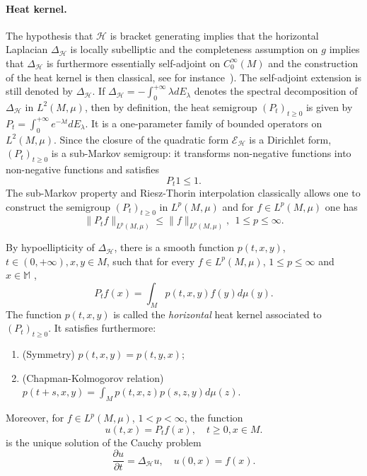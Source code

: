 \documentclass[11pt]{article}
\numberwithin{equation}{section}
\newcommand{\Ho}{\mathcal H}
\begin{document}
	\paragraph{Heat kernel.}The hypothesis that $\mathcal{H}$ is bracket generating implies that the horizontal Laplacian $\Delta_{\mathcal{H}}$ is locally subelliptic and the completeness assumption on $g$ implies that $\Delta_{\mathcal{H}}$ is furthermore essentially self-adjoint on $C_0^\infty(M)$ and the construction of the heat kernel is then classical, see for instance~\cite{BaudoinEMS2014}). The self-adjoint extension is still denoted by $\Delta_{\mathcal{H}}$. If $\Delta_\mathcal{H}=-\int_0^{+\infty} \lambda dE_\lambda$ denotes the spectral
decomposition of $\Delta_\mathcal{H}$ in $L^2 (M,\mu)$, then by definition, the
heat semigroup $(P_t)_{t \ge 0}$ is given by $P_t= \int_0^{+\infty}
e^{-\lambda t} dE_\lambda$. It is a one-parameter family of bounded operators on
$L^2 (M,\mu)$. Since the closure of the quadratic form $\mathcal{E}_\mathcal{H}$ is a Dirichlet form, $(P_t)_{t \ge 0}$ is a sub-Markov semigroup: it transforms non-negative functions into non-negative functions and satisfies
\begin{equation*}
P_t 1 \le 1.
\end{equation*}
The sub-Markov property and  Riesz-Thorin interpolation classically allows one to construct the semigroup $(P_t)_{t \ge 0}$ in $L^p(M,\mu)$ and for $f \in L^p(M,\mu)$ one has
\begin{equation*}
\|P_tf\|_{L^p(M , \mu)} \le \|f\|_{L^p(M, \mu)},\ \  1\le p\le \infty.
\end{equation*}

By hypoellipticity of $\Delta_\Ho$, there is a smooth function $p(t,x,y)$, $t \in (0,+\infty), x,y \in M$, such that for every $f \in L^p(M,\mu)$, $1 \le p \le \infty$ and $x \in \mathbb{M}$ ,
\[
P_t f (x)=\int_{M} p(t,x,y) f(y) d\mu (y).
\]
The function $p(t,x,y)$ is called the \emph{horizontal} heat kernel associated to $(P_t)_{t \ge 0}$. It satisfies furthermore:
\begin{enumerate}
\item (Symmetry) $p(t,x,y)=p(t,y,x)$;
\item (Chapman-Kolmogorov relation) $p(t+s,x,y)=\int_{M} p(t,x,z)p(s,z,y)d\mu(z)$. 
\end{enumerate}
Moreover, for $f \in L^p(M,\mu)$, $1 < p < \infty$, the function
\[
u (t,x)= P_t f (x), \quad t \ge 0, x\in M.
\]
is the unique solution of the Cauchy problem
\[
\frac{\partial u}{\partial t}= \Delta_{\mathcal H} u,\quad u (0,x)=f(x).
\]
\end{document}
